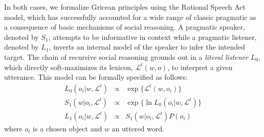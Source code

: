 In both cases, we formalize Gricean principles using the Rational Speech Act model, which has successfully accounted for a wide range of classic pragmatic as a consequence of basic mechanisms of social reasoning. 
A pragmatic speaker, denoted by $S_1$, attempts to be informative in context while a pragmatic listener, denoted by $L_1$, inverts an internal model of the speaker to infer the intended target. 
The chain of recursive social reasoning grounds out in a \emph{literal listener} $L_0$, which directly soft-maximizes its lexicon, $\mathcal{L}^t(w,o)$, to interpret a given utterance. 
This model can be formally specified as follows:
$$
\begin{array}{rcl}
L_0(o_i | w, \mathcal{L}^t) &\propto  & \exp\{\mathcal{L}^t(w,o_i)\} \\
S_1(w | o_i, \mathcal{L}^t) &\propto & \exp\{\ln L_0(o_i | w, \mathcal{L}^t)\} \\
L_1(o_i | w, \mathcal{L}^t) &\propto  & S_1(w | o_i, \mathcal{L}^t) P(o_i) 
\end{array}
$$
where $o_i$ is a chosen object and $w$ an uttered word.

